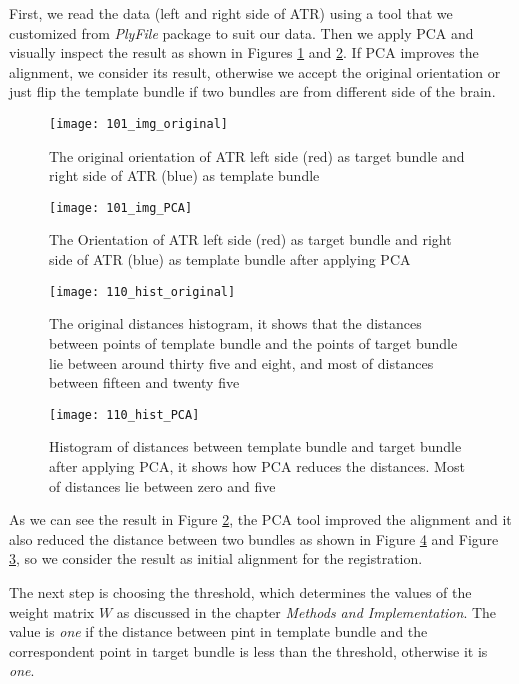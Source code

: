 \documentclass[../structure.tex]{subfiles}
\begin{document}
First, we read the data (left and right side of ATR) using a tool that we customized from \textit{PlyFile} package to suit our data. Then we apply PCA and visually inspect the result as shown in Figures \ref{fig:img_original} and \ref{fig:img_PCA}. If PCA improves the alignment, we consider its result, otherwise we accept the original orientation or just flip the template bundle if two bundles are from different side of the brain.

\begin{figure}[h!]
\centering
\texttt{[image: 101\_img\_original]}
\captionsetup{justification=centering}
\caption{The original orientation of ATR left side (red) as target bundle and right side of ATR (blue) as template bundle}
\label{fig:img_original}
\end{figure}

\begin{figure}[h!]
\centering
\texttt{[image: 101\_img\_PCA]}
\captionsetup{justification=centering}
\caption{The Orientation of ATR left side (red) as target bundle and right side of ATR (blue) as template bundle after applying PCA}
\label{fig:img_PCA}
\end{figure}

\begin{figure}[h!]
\centering
\texttt{[image: 110\_hist\_original]}
\captionsetup{justification=centering}
\caption{The original distances histogram, it shows that the distances between points of template bundle and the points of target bundle lie between around thirty five and eight, and most of distances between fifteen and twenty five}
\label{fig:hist_original}
\end{figure}

\begin{figure}[h!]
\centering
\texttt{[image: 110\_hist\_PCA]}
\captionsetup{justification=centering}
\caption{Histogram of distances between template bundle and target bundle after applying PCA, it shows how PCA reduces the distances. Most of distances lie between zero and five}
\label{fig:hist_PCA}
\end{figure}

As we can see the result in Figure \ref{fig:img_PCA}, the PCA tool improved the alignment and it also reduced the distance between two bundles as shown in Figure \ref{fig:hist_PCA} and Figure \ref{fig:hist_original}, so we consider the result as initial alignment for the registration.

The next step is choosing the threshold, which determines the values of the weight matrix $W$ as discussed in the chapter \textit{Methods and Implementation}. The value  is \textit{one} if the distance between pint in template bundle and the correspondent point in target bundle is less than the threshold, otherwise it is \textit{one}. 
\end{document}
